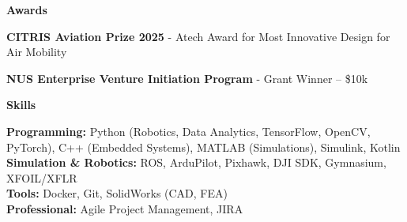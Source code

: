 \documentclass[10t]{article}
\begin{document}
\begin{center}
    \textbf{Awards}
\end{center}
\textbf{CITRIS Aviation Prize 2025} - Atech Award for Most Innovative Design for Air Mobility

\textbf{NUS Enterprise Venture Initiation Program} - Grant Winner – \$10k

\begin{center}
    \textbf{Skills}
\end{center}

\textbf{Programming:} Python (Robotics, Data Analytics, TensorFlow, OpenCV, PyTorch), C++ (Embedded Systems), MATLAB (Simulations), Simulink, Kotlin\\
\textbf{Simulation \& Robotics:} ROS, ArduPilot, Pixhawk, DJI SDK, Gymnasium, XFOIL/XFLR\\
\textbf{Tools:} Docker, Git, SolidWorks (CAD, FEA)\\
\textbf{Professional:} Agile Project Management, JIRA
\end{document}
